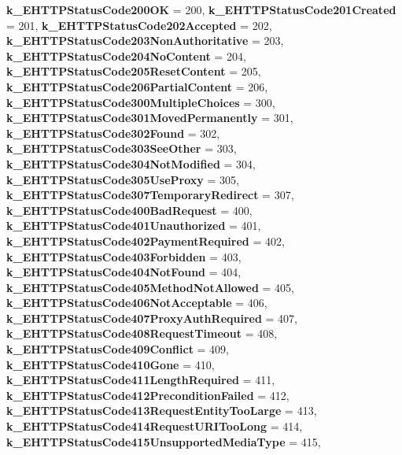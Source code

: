 \begin{DoxyCompactItemize}
{\bfseries k\+\_\+\+E\+H\+T\+T\+P\+Status\+Code200\+OK} = 200, 
\newline
{\bfseries k\+\_\+\+E\+H\+T\+T\+P\+Status\+Code201\+Created} = 201, 
{\bfseries k\+\_\+\+E\+H\+T\+T\+P\+Status\+Code202\+Accepted} = 202, 
{\bfseries k\+\_\+\+E\+H\+T\+T\+P\+Status\+Code203\+Non\+Authoritative} = 203, 
{\bfseries k\+\_\+\+E\+H\+T\+T\+P\+Status\+Code204\+No\+Content} = 204, 
\newline
{\bfseries k\+\_\+\+E\+H\+T\+T\+P\+Status\+Code205\+Reset\+Content} = 205, 
{\bfseries k\+\_\+\+E\+H\+T\+T\+P\+Status\+Code206\+Partial\+Content} = 206, 
{\bfseries k\+\_\+\+E\+H\+T\+T\+P\+Status\+Code300\+Multiple\+Choices} = 300, 
{\bfseries k\+\_\+\+E\+H\+T\+T\+P\+Status\+Code301\+Moved\+Permanently} = 301, 
\newline
{\bfseries k\+\_\+\+E\+H\+T\+T\+P\+Status\+Code302\+Found} = 302, 
{\bfseries k\+\_\+\+E\+H\+T\+T\+P\+Status\+Code303\+See\+Other} = 303, 
{\bfseries k\+\_\+\+E\+H\+T\+T\+P\+Status\+Code304\+Not\+Modified} = 304, 
{\bfseries k\+\_\+\+E\+H\+T\+T\+P\+Status\+Code305\+Use\+Proxy} = 305, 
\newline
{\bfseries k\+\_\+\+E\+H\+T\+T\+P\+Status\+Code307\+Temporary\+Redirect} = 307, 
{\bfseries k\+\_\+\+E\+H\+T\+T\+P\+Status\+Code400\+Bad\+Request} = 400, 
{\bfseries k\+\_\+\+E\+H\+T\+T\+P\+Status\+Code401\+Unauthorized} = 401, 
{\bfseries k\+\_\+\+E\+H\+T\+T\+P\+Status\+Code402\+Payment\+Required} = 402, 
\newline
{\bfseries k\+\_\+\+E\+H\+T\+T\+P\+Status\+Code403\+Forbidden} = 403, 
{\bfseries k\+\_\+\+E\+H\+T\+T\+P\+Status\+Code404\+Not\+Found} = 404, 
{\bfseries k\+\_\+\+E\+H\+T\+T\+P\+Status\+Code405\+Method\+Not\+Allowed} = 405, 
{\bfseries k\+\_\+\+E\+H\+T\+T\+P\+Status\+Code406\+Not\+Acceptable} = 406, 
\newline
{\bfseries k\+\_\+\+E\+H\+T\+T\+P\+Status\+Code407\+Proxy\+Auth\+Required} = 407, 
{\bfseries k\+\_\+\+E\+H\+T\+T\+P\+Status\+Code408\+Request\+Timeout} = 408, 
{\bfseries k\+\_\+\+E\+H\+T\+T\+P\+Status\+Code409\+Conflict} = 409, 
{\bfseries k\+\_\+\+E\+H\+T\+T\+P\+Status\+Code410\+Gone} = 410, 
\newline
{\bfseries k\+\_\+\+E\+H\+T\+T\+P\+Status\+Code411\+Length\+Required} = 411, 
{\bfseries k\+\_\+\+E\+H\+T\+T\+P\+Status\+Code412\+Precondition\+Failed} = 412, 
{\bfseries k\+\_\+\+E\+H\+T\+T\+P\+Status\+Code413\+Request\+Entity\+Too\+Large} = 413, 
{\bfseries k\+\_\+\+E\+H\+T\+T\+P\+Status\+Code414\+Request\+U\+R\+I\+Too\+Long} = 414, 
\newline
{\bfseries k\+\_\+\+E\+H\+T\+T\+P\+Status\+Code415\+Unsupported\+Media\+Type} = 415, 

\end{DoxyCompactItemize}
